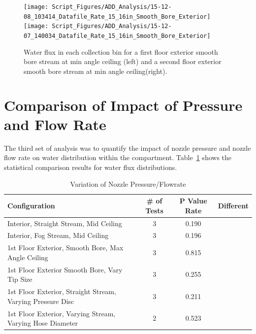 \documentclass[12pt,oneside]{book}
\begin{document}
\begin{figure}[ht]
\texttt{[image: Script\_Figures/ADD\_Analysis/15-12-08\_103414\_Datafile\_Rate\_15\_16in\_Smooth\_Bore\_Exterior]}
\texttt{[image: Script\_Figures/ADD\_Analysis/15-12-07\_140034\_Datafile\_Rate\_15\_16in\_Smooth\_Bore\_Exterior]} \\ 
\caption[Water Flux for Smooth Bore Min Angle Ceiling Varying Exterior Floor]{Water flux in each collection bin for a first floor exterior smooth bore stream at min angle ceiling (left) and a second floor exterior smooth bore stream at min angle ceiling(right).}
\label{fig:Exterior_First_Floor_Second_Floor_SB_MAC}
\end{figure}

\clearpage

\section{Comparison of Impact of Pressure and Flow Rate}
\label{sec:pressure}
The third set of analysis was to quantify the impact of nozzle pressure and nozzle flow rate on water distribution within the compartment. Table~\ref{tab:add_pressure} shows the statistical comparison results for water flux distributions. 

\begin{table}[!ht]
\centering
\footnotesize
\caption{Variation of Nozzle Pressure/Flowrate}
\label{tab:add_pressure}
\begin{tabular}{lccc}
\toprule[1.5pt]
Configuration & \# of Tests & P Value Rate & Different \\ 
\midrule
 Interior, Straight Stream, Mid Ceiling                      & 3   & 0.190   &            \\
 Interior, Fog Stream, Mid Ceiling                           & 3   & 0.196   &            \\
 1st Floor Exterior, Smooth Bore, Max Angle Ceiling          & 3   & 0.815   &            \\
 1st Floor Exterior Smooth Bore, Vary Tip Size               & 3   & 0.255   &            \\
 1st Floor Exterior, Straight Stream, Varying Pressure Disc  & 3   & 0.211   &            \\
 1st Floor Exterior, Varying Stream, Varying Hose Diameter   & 2   & 0.523   &            \\
\bottomrule[1.25pt]
\end{tabular}
\end{table}
\end{document}

